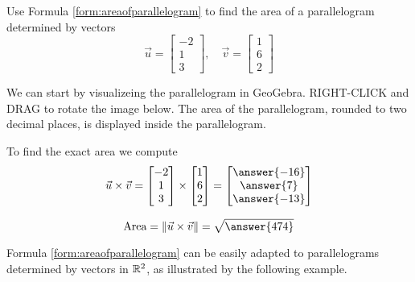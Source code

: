 \documentclass{ximera}
\begin{document}
\begin{example}\label{ex:areaOfParFormula}
    Use Formula \ref{form:areaofparallelogram} to find the area of a parallelogram determined by vectors
    $$\vec{u}=\begin{bmatrix}-2\\1\\3\end{bmatrix},\quad \vec{v}=\begin{bmatrix}1\\6\\2\end{bmatrix}$$
\begin{explanation}
    We can start by visualizeing the parallelogram in GeoGebra.  RIGHT-CLICK and DRAG to rotate the image below.  The area of the parallelogram, rounded to two decimal places, is displayed inside the parallelogram.
 
 
\begin{onlineOnly}   
\begin{center}
\end{center}
\end{onlineOnly}
 
    To find the exact area we compute
    $$\vec{u}\times \vec{v}=\begin{bmatrix}-2\\1\\3\end{bmatrix}\times \begin{bmatrix}1\\6\\2\end{bmatrix}=\begin{bmatrix}\answer{-16}\\\answer{7}\\\answer{-13}\end{bmatrix}$$
 
    $$\mbox{Area}=\norm{\vec{u}\times\vec{v}}=\sqrt{\answer{474}}$$
\end{explanation}
\end{example}
 
Formula \ref{form:areaofparallelogram} can be easily adapted to parallelograms determined by vectors in $\mathbb{R}^2$, as illustrated by the following example.
 
\end{document}
